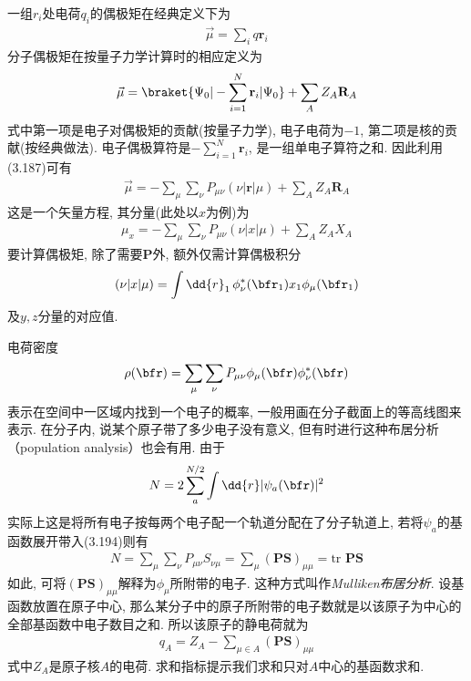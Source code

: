 一组$r_i$处电荷$q_i$的偶极矩在经典定义下为
\begin{align}
	\vec{\mu} = \sum_i q\mathbf{r}_i
\end{align}
分子偶极矩在按量子力学计算时的相应定义为
\begin{align}
	\vec{\mu} = \braket{\Psi_0|-\sum_{i=1}^{N}\mathbf{r}_i|\Psi_0} + \sum_AZ_A\mathbf{R}_A
\end{align}
式中第一项是电子对偶极矩的贡献(按量子力学), 
电子电荷为$-1$, 
第二项是核的贡献(按经典做法). 
电子偶极算符是$-\sum_{i=1}^{N}\mathbf{r}_i$, 
是一组单电子算符之和. 
因此利用(3.187)可有
\begin{align}
	\vec{\mu} = -\sum_\mu\sum_\nu P_{\mu\nu}(\nu|\mathbf{r}|\mu) + \sum_AZ_A\mathbf{R}_A
\end{align}
这是一个矢量方程, 
其分量(此处以$x$为例)为
\begin{align}
	\mu_x = -\sum_\mu\sum_\nu P_{\mu\nu}(\nu|x|\mu) + \sum_AZ_AX_A
\end{align}
要计算偶极矩, 
除了需要$\mathbf{P}$外, 
额外仅需计算偶极积分
\begin{align}
	(\nu|x|\mu) = \int\dd{r}_1\,\phi_\nu^*(\bfr_1)x_1\phi_\mu(\bfr_1)
\end{align}
及$y,z$分量的对应值.


电荷密度
\begin{align}
	\rho(\bfr) = \sum_\mu\sum_\nu P_{\mu\nu}\phi_\mu(\bfr)\phi_\nu^*(\bfr)
\end{align}
表示在空间中一区域内找到一个电子的概率, 一般用画在分子截面上的等高线图来表示. 
在分子内, 说某个原子带了多少电子没有意义, 但有时进行这种布居分析（population analysis）也会有用. 由于
\begin{align}
	N = 2\sum_{a}^{N/2}\int\dd{r}|\psi_a(\bfr)|^2
\end{align}
实际上这是将所有电子按每两个电子配一个轨道分配在了分子轨道上, 
若将$\psi_a$的基函数展开带入(3.194)则有
\begin{align}
	N = \sum_\mu\sum_\nu P_{\mu\nu}S_{\nu\mu} = \sum_\mu(\mathbf{PS})_{\mu\mu} = \mathrm{tr}\,\,\mathbf{PS}
\end{align}
如此, 
可将$(\mathbf{PS})_{\mu\mu}$解释为$\phi_\mu$所附带的电子. 
这种方式叫作\emph{Mulliken布居分析}. 
设基函数放置在原子中心, 
那么某分子中的原子所附带的电子数就是以该原子为中心的全部基函数中电子数目之和. 
所以该原子的静电荷就为
\begin{align}
	q_A = Z_A - \sum_{\mu\in A}(\mathbf{PS})_{\mu\mu}
\end{align}
式中$Z_A$是原子核$A$的电荷. 
求和指标提示我们求和只对$A$中心的基函数求和.


